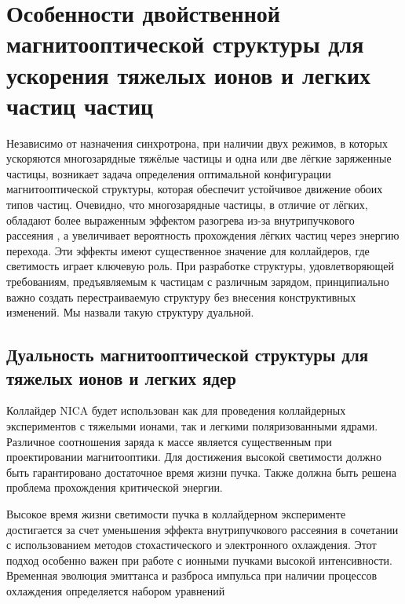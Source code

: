 
	\chapter{Особенности двойственной магнитооптической структуры для ускорения тяжелых ионов и легких частиц частиц}\label{ch:dual}

\par Независимо от назначения синхротрона, при наличии двух режимов, в которых ускоряются многозарядные тяжёлые частицы и одна или две лёгкие заряженные частицы, возникает задача определения оптимальной конфигурации магнитооптической структуры, которая обеспечит устойчивое движение обоих типов частиц. Очевидно, что многозарядные частицы, в отличие от лёгких, обладают более выраженным эффектом разогрева из-за внутрипучкового рассеяния \cite{trubnikov:cool}, а увеличивает вероятность прохождения лёгких частиц через энергию перехода. Эти эффекты имеют существенное значение для коллайдеров, где светимость играет ключевую роль. При разработке структуры, удовлетворяющей требованиям, предъявляемым к частицам с различным зарядом, принципиально важно создать перестраиваемую структуру без внесения конструктивных изменений. Мы назвали такую структуру дуальной.

	\section{Дуальность магнитооптической структуры для тяжелых ионов и легких ядер}\label{sec:ch:ions_light/duality}
	
\par Коллайдер NICA будет использован как для проведения коллайдерных экспериментов с тяжелыми ионами, так и легкими поляризованными ядрами. Различное соотношения заряда к массе является существенным при проектировании магнитооптики. Для достижения высокой светимости должно быть гарантировано достаточное время жизни пучка. Также должна быть решена проблема прохождения критической энергии.	

\par Высокое время жизни светимости пучка в коллайдерном эксперименте достигается за счет уменьшения эффекта внутрипучкового рассеяния в сочетании с использованием методов стохастического и электронного охлаждения. Этот подход особенно важен при работе с ионными пучками высокой интенсивности. Временная эволюция эмиттанса и разброса импульса при наличии процессов охлаждения определяется набором уравнений

